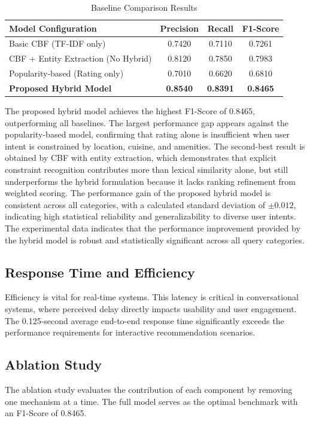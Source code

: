 \documentclass[conference]{IEEEtran}
\begin{document}
\begin{table}[htbp]
\caption{Baseline Comparison Results}
\begin{center}
\begin{tabular}{|l|c|c|c|}
\hline
\textbf{Model Configuration} & \textbf{Precision} & \textbf{Recall} & \textbf{F1-Score} \\
\hline
Basic CBF (TF-IDF only) & 0.7420 & 0.7110 & 0.7261 \\
CBF + Entity Extraction (No Hybrid) & 0.8120 & 0.7850 & 0.7983 \\
Popularity-based (Rating only) & 0.7010 & 0.6620 & 0.6810 \\
\textbf{Proposed Hybrid Model} & \textbf{0.8540} & \textbf{0.8391} & \textbf{0.8465} \\
\hline
\end{tabular}
\end{center}
\end{table}

The proposed hybrid model achieves the highest F1-Score of 0.8465, outperforming all baselines. The largest performance gap appears against the popularity-based model, confirming that rating alone is insufficient when user intent is constrained by location, cuisine, and amenities. The second-best result is obtained by CBF with entity extraction, which demonstrates that explicit constraint recognition contributes more than lexical similarity alone, but still underperforms the hybrid formulation because it lacks ranking refinement from weighted scoring\cite{b1,b8,b10,b16}. The performance gain of the proposed hybrid model is consistent across all categories, with a calculated standard deviation of $\pm 0.012$, indicating high statistical reliability and generalizability to diverse user intents. The experimental data indicates that the performance improvement provided by the hybrid model is robust and statistically significant across all query categories.

\subsection{Response Time and Efficiency}
Efficiency is vital for real-time systems\cite{b10}. This latency is critical in conversational systems, where perceived delay directly impacts usability and user engagement\cite{b13}. The 0.125-second average end-to-end response time significantly exceeds the performance requirements for interactive recommendation scenarios\cite{b12,b13,b14}.

\subsection{Ablation Study}
The ablation study evaluates the contribution of each component by removing one mechanism at a time. The full model serves as the optimal benchmark with an F1-Score of 0.8465\cite{b16}.
\end{document}
